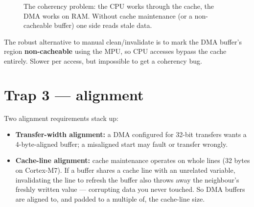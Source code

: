 \documentclass[11pt,a4paper,oneside]{book}
\begin{document}
\begin{figure}[h]
\centering
{}
\caption{The coherency problem: the CPU works through the cache, the DMA works
on RAM. Without cache maintenance (or a non-cacheable buffer) one side reads
stale data.}
\label{fig:cache-dma}
\end{figure}

The robust alternative to manual clean/invalidate is to mark the DMA buffer's
region \textbf{non-cacheable} using the MPU, so CPU accesses bypass the cache
entirely. Slower per access, but impossible to get a coherency bug.

\section{Trap 3 --- alignment}
Two alignment requirements stack up:
\begin{itemize}[leftmargin=1.4cm]
  \item \textbf{Transfer-width alignment:} a DMA configured for 32-bit transfers
        wants a 4-byte-aligned buffer; a misaligned start may fault or transfer
        wrongly.
  \item \textbf{Cache-line alignment:} cache maintenance operates on whole lines
        (32 bytes on Cortex-M7). If a buffer shares a cache line with an
        unrelated variable, invalidating the line to refresh the buffer also
        throws away the neighbour's freshly written value --- corrupting data you
        never touched. So DMA buffers are aligned to, and padded to a multiple
        of, the cache-line size.
\end{itemize}
\end{document}
